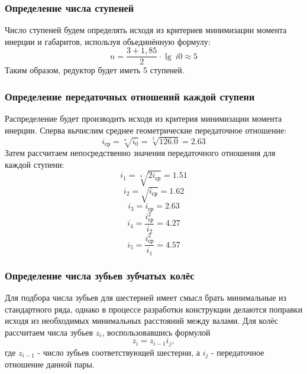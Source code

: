 \documentclass[14pt,a4paper,russian]{scrartcl}
\begin{document}
    \subsubsection{Определение числа ступеней}
        Число ступеней будем определять исходя из критериев минимизации
        момента инерции и габаритов, используя обьединённую формулу:
         \[ n = \frac{3+1,85}{2}\cdot\lg\ i0 \approx 5 \]
        Таким образом, редуктор будет иметь 5 ступеней.
    
    \subsubsection{Определение передаточных отношений каждой ступени}
        Распределение будет производить исходя из критерия минимизации
        момента инерции.
        Сперва вычислим среднее геометрические передаточное отношение:
        \newcommand{\iavr}{i_{\text{ср}}}
         \[ \iavr = \sqrt[n]{i_0} = \sqrt[5]{126.0} = 2.63 \]
        Затем рассчитаем непосредственно значения передаточного отношения для каждой ступени:
         \[ i_1 = \sqrt[4]{2\iavr} = 1.51 \]
        \[ i_2 = \sqrt{\iavr} = 1.62 \]
        \[ i_3 = \iavr = 2.63 \]
        \[ i_4 = \frac{\iavr^2}{i_2} = 4.27 \]
        \[ i_5 = \frac{\iavr^2}{i_1} = 4.57\]
    
    \subsubsection{Определение числа зубьев зубчатых колёс}
        Для подбора числа зубьев для шестерней имеет смысл брать минимальные из стандартного ряда,
        однако в процессе разработки конструкции делаются поправки исходя из необходимых
        минимальных расстояний между валами.
        Для колёс рассчитаем числа зубьев \( z_i \), воспользовавшись формулой
        \[ z_i = z_{i-1}i_j, \]
        где \( z_{i-1} \) - число зубьев соответствующей шестерни, а \( i_j \) - 
        передаточное отношение данной пары.
        
\end{document}
